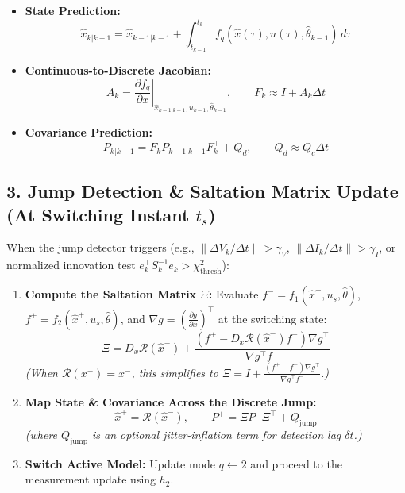 \documentclass{article}
\begin{document}
\begin{itemize}
    \item \textbf{State Prediction:}
    \begin{equation}
        \hat{x}_{k|k-1} = \hat{x}_{k-1|k-1} + \int_{t_{k-1}}^{t_k} f_q(\hat{x}(\tau), u(\tau), \hat{\theta}_{k-1})\, d\tau
    \end{equation}
    
    \item \textbf{Continuous-to-Discrete Jacobian:}
    \begin{equation}
        A_k = \left. \frac{\partial f_q}{\partial x} \right|_{\hat{x}_{k-1|k-1}, u_{k-1}, \hat{\theta}_{k-1}}, \qquad F_k \approx I + A_k \Delta t
    \end{equation}
    
    \item \textbf{Covariance Prediction:}
    \begin{equation}
        P_{k|k-1} = F_k P_{k-1|k-1} F_k^\top + Q_d, \qquad Q_d \approx Q_c \Delta t
    \end{equation}
\end{itemize}

\subsection*{3. Jump Detection \& Saltation Matrix Update (At Switching Instant $t_s$)}
When the jump detector triggers (e.g., $\|\Delta V_k / \Delta t\| > \gamma_V$, $\|\Delta I_k / \Delta t\| > \gamma_I$, or normalized innovation test $e_k^\top S_k^{-1} e_k > \chi^2_{\text{thresh}}$):

\begin{enumerate}
    \item \textbf{Compute the Saltation Matrix $\Xi$:}
    Evaluate $f^- = f_1(\hat{x}^-, u_s, \hat{\theta})$, $f^+ = f_2(\hat{x}^+, u_s, \hat{\theta})$, and $\nabla g = \left(\frac{\partial g}{\partial x}\right)^\top$ at the switching state:
    \begin{equation}
        \Xi = D_x \mathcal{R}(\hat{x}^-) + \frac{\left(f^+ - D_x \mathcal{R}(\hat{x}^-) f^-\right) \nabla g^\top}{\nabla g^\top f^-}
    \end{equation}
    \textit{(When $\mathcal{R}(x^-) = x^-$, this simplifies to $\Xi = I + \frac{(f^+ - f^-) \nabla g^\top}{\nabla g^\top f^-}$.)}
    
    \item \textbf{Map State \& Covariance Across the Discrete Jump:}
    \begin{equation}
        \hat{x}^+ = \mathcal{R}(\hat{x}^-), \qquad P^+ = \Xi P^- \Xi^\top + Q_{\text{jump}}
    \end{equation}
    \textit{(where $Q_{\text{jump}}$ is an optional jitter-inflation term for detection lag $\delta t$.)}
    
    \item \textbf{Switch Active Model:} Update mode $q \leftarrow 2$ and proceed to the measurement update using $h_2$.
\end{enumerate}
\end{document}
